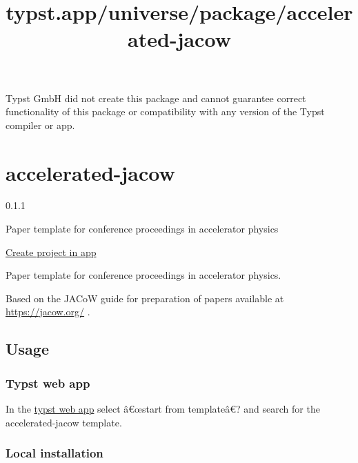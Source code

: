 Typst GmbH did not create this package and cannot guarantee correct
functionality of this package or compatibility with any version of the
Typst compiler or app.


\title{typst.app/universe/package/accelerated-jacow}

\label{banner}
\label{template-thumbnail}

\section{accelerated-jacow}\label{accelerated-jacow}

{ 0.1.1 }

Paper template for conference proceedings in accelerator physics

\href{/app?template=accelerated-jacow&version=0.1.1}{Create project in
app}

\label{readme}
\href{https://github.com/eltos/accelerated-jacow}{}
\href{https://typst.app/universe/package/accelerated-jacow}{}

Paper template for conference proceedings in accelerator physics.

Based on the JACoW guide for preparation of papers available at
\url{https://jacow.org/} .

\subsection{Usage}\label{usage}

\subsubsection{Typst web app}\label{typst-web-app}

In the \href{https://typst.app/}{typst web app} select â€œstart from
templateâ€? and search for the accelerated-jacow template.

\subsubsection{Local installation}\label{local-installation}

